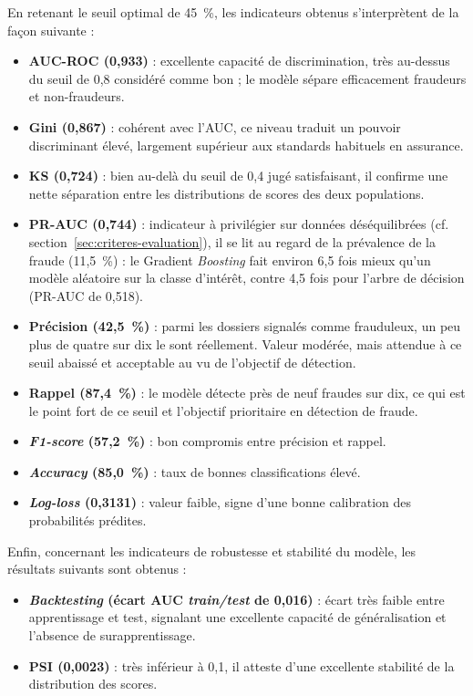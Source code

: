 En retenant le seuil optimal de 45~\%, les indicateurs obtenus s'interprètent de la façon suivante :

\begin{itemize}[label = $\bullet$]
    \item \textbf{AUC-ROC (0,933)} : excellente capacité de discrimination, très au-dessus du seuil de 0,8 considéré comme bon ; le modèle sépare efficacement fraudeurs et non-fraudeurs.
    \item \textbf{Gini (0,867)} : cohérent avec l'AUC, ce niveau traduit un pouvoir discriminant élevé, largement supérieur aux standards habituels en assurance.
    \item \textbf{KS (0,724)} : bien au-delà du seuil de 0,4 jugé satisfaisant, il confirme une nette séparation entre les distributions de scores des deux populations.
    \item \textbf{PR-AUC (0,744)} : indicateur à privilégier sur données déséquilibrées (cf. section~\ref{sec:criteres-evaluation}), il se lit au regard de la prévalence de la fraude (11,5~\%) : le Gradient \textit{Boosting} fait environ 6,5 fois mieux qu'un modèle aléatoire sur la classe d'intérêt, contre 4,5 fois pour l'arbre de décision (PR-AUC de 0,518).
    \item \textbf{Précision (42,5~\%)} : parmi les dossiers signalés comme frauduleux, un peu plus de quatre sur dix le sont réellement. Valeur modérée, mais attendue à ce seuil abaissé et acceptable au vu de l'objectif de détection.
    \item \textbf{Rappel (87,4~\%)} : le modèle détecte près de neuf fraudes sur dix, ce qui est le point fort de ce seuil et l'objectif prioritaire en détection de fraude.
    \item \textbf{\textit{F1-score} (57,2~\%)} : bon compromis entre précision et rappel.
    \item \textbf{\textit{Accuracy} (85,0~\%)} : taux de bonnes classifications élevé.
    \item \textbf{\textit{Log-loss} (0,3131)} : valeur faible, signe d'une bonne calibration des probabilités prédites.
\end{itemize}   
 
Enfin, concernant les indicateurs de robustesse et stabilité du modèle, les résultats suivants sont obtenus :

\begin{itemize}[label = $\bullet$]
    \item \textbf{\textit{Backtesting} (écart AUC \textit{train/test} de 0,016)} : écart très faible entre apprentissage et test, signalant une excellente capacité de généralisation et l'absence de surapprentissage.
    \item \textbf{PSI (0,0023)} : très inférieur à 0,1, il atteste d'une excellente stabilité de la distribution des scores.
\end{itemize}


